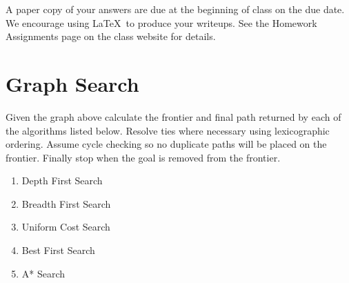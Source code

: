\documentclass[12pt]{article}
\begin{document}

A paper copy of your answers are due at the beginning of class on the due date. We encourage using \LaTeX\ to produce your writeups. See the Homework Assignments page on the class website for details.

\section{Graph Search}

Given the graph above calculate the frontier and final path returned by each of the algorithms listed below. Resolve ties where necessary using lexicographic ordering. Assume cycle checking so no duplicate paths will be placed on the frontier. Finally stop when the goal is removed from the frontier.

\begin{enumerate}

\item Depth First Search

\item Breadth First Search

\item Uniform Cost Search

\item Best First Search

\item A* Search

\end{enumerate}
\end{document}
